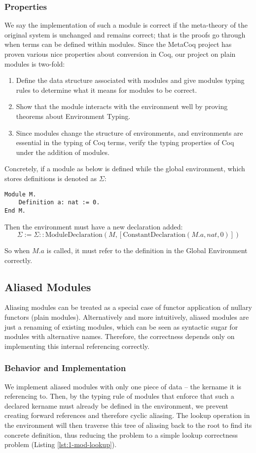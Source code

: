\subsubsection{Properties}

We say the implementation of such a module is correct if the meta-theory of the
original system is unchanged and remains correct; that is the proofs go through
when terms can be defined within modules. Since the MetaCoq project has proven
various nice properties about conversion in Coq, our project on plain modules is
two-fold:

\begin{enumerate}
\item Define the data structure associated with modules and give modules typing
rules to determine what it means for modules to be correct.
\item Show that the module interacts with the environment well by proving
theorems about Environment Typing.
\item Since modules change the structure of environments, and environments are
essential in the typing of Coq terms, verify the typing properties of Coq under
the addition of modules.
\end{enumerate}


Concretely, if a module as below is defined while the global environment, which
stores definitions is denoted as $\Sigma$:
\begin{verbatim}
Module M.
    Definition a: nat := 0.
End M.
\end{verbatim}
Then the environment must have a new declaration added:
\[\Sigma := \Sigma :: \text{ModuleDeclaration}(M,
[\text{ConstantDeclaration}(M.a, nat, 0)])\]

So when $M.a$ is called, it must refer to the definition in the Global
Environment correctly.

\subsection{Aliased Modules}
Aliasing modules can be treated as a special case of functor application of
nullary functors (plain modules). Alternatively and more intuitively, aliased
modules are just a renaming of existing modules, which can be seen as syntactic
sugar for modules with alternative names. Therefore, the correctness depends
only on implementing this internal referencing correctly.

\subsubsection{Behavior and Implementation}
We implement aliased modules with only one piece of data -- the kername it is
referencing to. Then, by the typing rule of modules that enforce that such a
declared kername must already be defined in the environment, we prevent creating
forward references and therefore cyclic aliasing. The lookup operation in the
environment will then traverse this tree of aliasing back to the root to find
its concrete definition, thus reducing the problem to a simple lookup
correctness problem (Listing \ref{lst:1-mod-lookup}).

